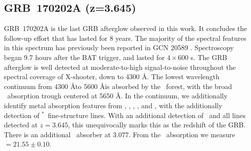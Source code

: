 \documentclass{aa}    %
\begin{document}
\subsection{GRB~170202A (z=3.645)}\label{170202}

GRB~170202A is the last GRB afterglow observed in this work. It concludes the
follow-up effort that has lasted for 8 years. The majority of the spectral
features in this spectrum has previously been reported in GCN 20589
\citep{GCN20589}. Spectroscopy began 9.7 hours after the BAT trigger, and lasted
for $4 \times 600$ s. The GRB afterglow is well detected at moderate-to-high
signal-to-noise throughout the spectral coverage of X-shooter, down to 4300 \AA.
The lowest wavelength continuum from 4300 \AA to 5600 \AA is absorbed by the
\lya~forest, with the broad \lya~absorption trough centered at 5650 \AA. In the
continuum, we additionally identify metal absorption features from \SIii, \civ,
\SIiv, \feii, and \mgii, with the additionally detection of
\SIii$^*$~fine-structure lines. With an additional detection of \oiii~and all
lines detected at $z=3.645$, this unequivocally marks this as the redshift of
the GRB. There is an additional \civ~absorber at $3.077$. From the
\lya~absorption we measure \nh$= 21.55 \pm 0.10$.

%
%
\end{document}
